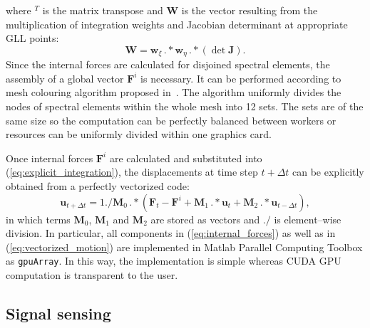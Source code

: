 \documentclass[12pt]{iopart}
\renewcommand{\vec}[1]{\mathbf{#1}}
\begin{document}
where \(^T\) is the matrix transpose and \(\vec{W}\) is the vector resulting from the multiplication of integration weights and Jacobian determinant at appropriate GLL points:
\begin{equation}
\vec{W} = \vec{w}_{\xi}\,.*\vec{w}_{\eta}\,.*\left(\det\vec{J}\right).
\end{equation}
Since the internal forces are calculated for disjoined spectral elements, the assembly of a global vector \(\vec{F}^i\) is necessary. It can be performed according to mesh colouring algorithm proposed in~\cite{Kudela2016}. The algorithm uniformly divides the nodes of spectral elements within the whole mesh into 12 sets. The sets are of the same size so the computation can be perfectly balanced between workers or resources can be uniformly divided within one graphics card.

Once internal forces \(\vec{F}^i\) are calculated and substituted into (\ref{eq:explicit_integration}), the displacements at time step \(t+\Delta t\) can be explicitly obtained from a perfectly vectorized code:
\begin{equation}
\vec{u}_{t+\Delta t}=1./\vec{M}_0\, .*\left(\vec{F}_t - \vec{F}^i +\vec{M}_1 \, .* \vec{u}_t +\vec{M}_2 \, .* \vec{u}_{t-\Delta t}\right),
\label{eq:vectorized_motion}
\end{equation} 
in which terms \(\vec{M}_0\), \(\vec{M}_1\) and \(\vec{M}_2\) are stored as vectors and \(./\) is element--wise division. In particular, all components in (\ref{eq:internal_forces}) as well as in (\ref{eq:vectorized_motion}) are implemented in Matlab Parallel Computing Toolbox as \verb|gpuArray|. In this way, the implementation is simple whereas CUDA GPU computation is transparent to the user. 

\subsection{Signal sensing}
\end{document}
